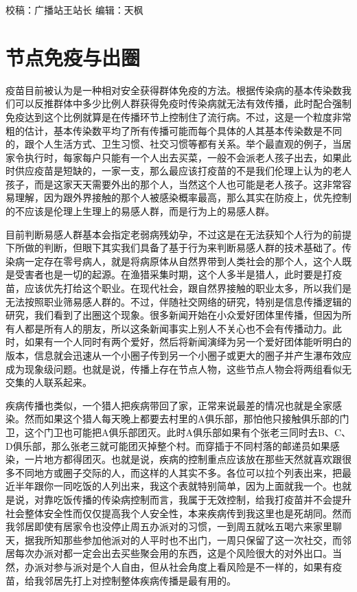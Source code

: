 \documentclass[
]{book}
\begin{document}
校稿：广播站王站长
编辑：天枫

\hypertarget{ux8282ux70b9ux514dux75abux4e0eux51faux5708}{%
\section{节点免疫与出圈}\label{ux8282ux70b9ux514dux75abux4e0eux51faux5708}}

疫苗目前被认为是一种相对安全获得群体免疫的方法。根据传染病的基本传染数我们可以反推群体中多少比例人群获得免疫时传染病就无法有效传播，此时配合强制免疫达到这个比例就算是在传播环节上控制住了流行病。不过，这是一个粒度非常粗的估计，基本传染数平均了所有传播可能而每个具体的人其基本传染数是不同的，跟个人生活方式、卫生习惯、社交习惯等都有关系。举个最直观的例子，当居家令执行时，每家每户只能有一个人出去买菜，一般不会派老人孩子出去，如果此时供应疫苗是短缺的，一家一支，那么最应该打疫苗的不是我们伦理上认为的老人孩子，而是这家天天需要外出的那个人，当然这个人也可能是老人孩子。这非常容易理解，因为跟外界接触的那个人被感染概率最高，那么其实在防疫上，优先控制的不应该是伦理上生理上的易感人群，而是行为上的易感人群。

目前判断易感人群基本会指定老弱病残幼孕，不过这是在无法获知个人行为的前提下所做的判断，但眼下其实我们具备了基于行为来判断易感人群的技术基础了。传染病一定存在零号病人，就是将病原体从自然界带到人类社会的那个人，这个人既是受害者也是一切的起源。在渔猎采集时期，这个人多半是猎人，此时要是打疫苗，应该优先打给这个职业。在现代社会，跟自然界接触的职业太多，所以我们是无法按照职业筛易感人群的。不过，伴随社交网络的研究，特别是信息传播逻辑的研究，我们看到了出圈这个现象。很多新闻开始在小众爱好团体里传播，但因为所有人都是所有人的朋友，所以这条新闻事实上别人不关心也不会有传播动力。此时，如果有一个人同时有两个爱好，然后将新闻演绎为另一个爱好团体能听明白的版本，信息就会迅速从一个小圈子传到另一个小圈子或更大的圈子并产生瀑布效应成为现象级问题。也就是说，传播上存在节点人物，这些节点人物会将两组看似无交集的人联系起来。

疾病传播也类似，一个猎人把疾病带回了家，正常来说最差的情况也就是全家感染。然而如果这个猎人每天晚上都要去村里的A俱乐部，那怕他只接触俱乐部的门卫，这个门卫也可能把A俱乐部团灭。此时A俱乐部如果有个张老三同时去B、C、D俱乐部，那么张老三就可能团灭掉整个村。而穿插于不同村落的邮递员如果感染，一片地方都得团灭。也就是说，疾病的控制重点应该放在那些天然就喜欢跟很多不同地方或圈子交际的人，而这样的人其实不多。各位可以拉个列表出来，把最近半年跟你一同吃饭的人列出来，我这个表就特别简单，因为上面就我一个。也就是说，对靠吃饭传播的传染病控制而言，我属于无效控制，给我打疫苗并不会提升社会整体安全性而仅仅提高我个人安全性，本来疾病传到我这里也是死胡同。然而我邻居即使有居家令也没停止周五办派对的习惯，一到周五就吆五喝六来家里聊天，据我所知那些参加他派对的人平时也不出门，一周只保留了这一次社交，而邻居每次办派对都一定会出去买些聚会用的东西，这是个风险很大的对外出口。当然，办派对参与派对是个人自由，但从社会角度上看风险是不一样的，如果有疫苗，给我邻居先打上对控制整体疾病传播是最有用的。
\end{document}
